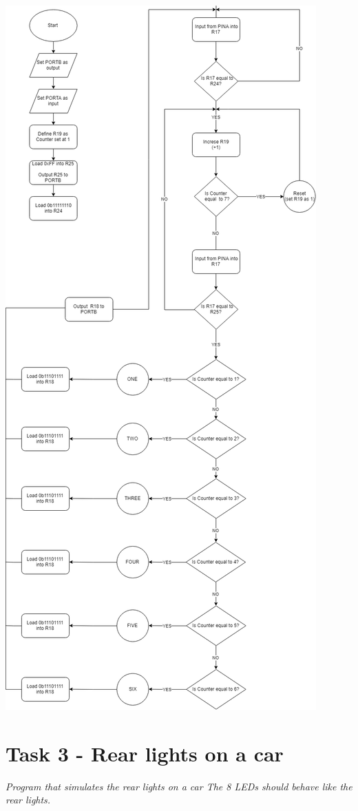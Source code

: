 \documentclass[a4paper,12pt]{article}
\begin{document}
\begin{center}
\includegraphics[scale=0.6]{img/Task2.png}
\end{center}

\newpage
\section{Task 3 - Rear lights on a car}
\textit{Program that simulates the rear lights on a car
The 8 LEDs should behave like the rear lights.}
\end{document}
